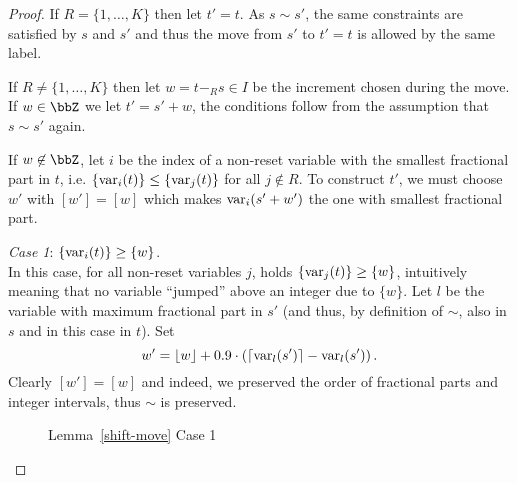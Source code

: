 \documentclass[fleqn,envcountsame]{LMCS}
\newcommand{\floor}[1]{\ensuremath{\lfloor #1 \rfloor}}
\newcommand{\ceil}[1]{\ensuremath{\lceil #1 \rceil}}
\begin{document}
\begin{proof}
If $R = \{1, \ldots, K\}$ then let $t' = t$.
As $s \sim s'$, the same constraints are satisfied by $s$ and $s'$ and thus
the move from $s'$ to $t' = t$ is allowed by the same label.

If $R \neq \{1, \ldots, K\}$ then let $w = t -_R s \in I$ be the increment
chosen during the move. If $w \in \bbZ$ we let $t' = s'+w$, the conditions
follow from the assumption that $s \sim s'$ again.

If $w \not\in \bbZ$, let $i$ be the index of a non-reset variable
with the smallest fractional part in $t$, i.e.
$\{ \mathrm{var}_i(t) \} \leq \{ \mathrm{var}_j(t) \}$ for all $j \not\in R$.
To construct $t'$, we must choose $w'$ with $[w'] = [w]$ which makes
$\mathrm{var}_i(s'+w')$ the one with smallest fractional part. 

\emph{Case 1}: $\{ \mathrm{var}_i(t) \} \geq \{w\}$.\\
  In this case, for all non-reset variables $j$, holds
  $\{ \mathrm{var}_j(t) \} \geq \{w\}$, intuitively meaning
  that no variable ``jumped'' above an integer due to $\{w\}$.
  Let $l$ be the variable with maximum fractional part in $s'$
  (and thus, by definition of $\sim$, also in $s$ and in this case in $t$). Set 
  \[ w' = \floor{w} + 0.9 \cdot \left(\ceil{\var_l(s')} - \var_l(s')\right) .\]
  Clearly $[w'] = [w]$ and indeed, we preserved the order of
  fractional parts and integer intervals, thus $\sim$ is preserved.

\begin{figure}[h]
\begin{center}
\end{center}
\caption{Lemma~\ref{shift-move} Case 1}
\label{fig-case-1}
\end{figure}


\end{proof}
\end{document}
